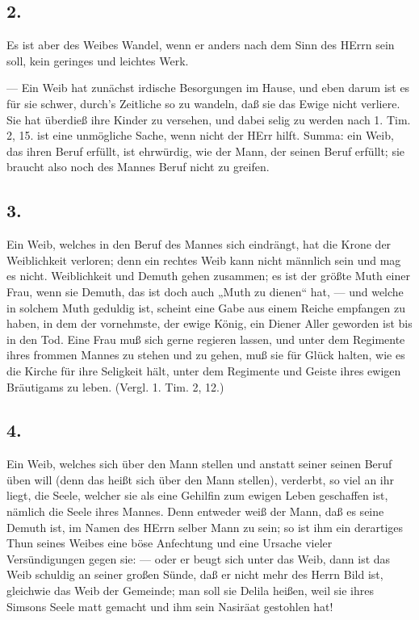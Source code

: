 \subsection{2.}

Es ist aber des Weibes Wandel, wenn er anders nach dem Sinn des HErrn sein soll, kein geringes und leichtes Werk.

— Ein Weib hat zunächst irdische Besorgungen im Hause, und eben darum ist es für sie schwer, durch’s Zeitliche so zu wandeln, daß sie das Ewige nicht verliere. Sie hat überdieß
ihre Kinder zu versehen, und dabei selig zu werden nach 1. Tim. 2, 15. ist eine unmögliche Sache, wenn nicht der HErr hilft. Summa: ein Weib, das ihren Beruf erfüllt, ist ehrwürdig, wie der Mann, der seinen Beruf erfüllt; sie braucht also noch des Mannes Beruf nicht zu greifen.

\subsection{3.}

Ein Weib, welches in den Beruf des Mannes sich eindrängt, hat die Krone der Weiblichkeit verloren; denn ein rechtes Weib kann nicht männlich sein und mag es nicht. Weiblichkeit und Demuth gehen zusammen; es ist der größte Muth einer Frau, wenn sie Demuth, das ist doch auch „Muth zu dienen“ hat, — und welche in solchem Muth geduldig ist, scheint eine Gabe aus einem Reiche empfangen zu haben, in dem der vornehmste, der ewige König, ein Diener Aller geworden ist bis in den Tod. Eine Frau muß sich gerne regieren lassen, und unter dem Regimente ihres frommen Mannes zu stehen und zu gehen, muß sie für Glück halten, wie es die Kirche für ihre Seligkeit hält, unter dem Regimente und Geiste ihres ewigen Bräutigams zu leben. (Vergl. 1. Tim. 2, 12.)

\subsection{4.}

Ein Weib, welches sich über den Mann stellen und anstatt seiner seinen Beruf üben will (denn das heißt sich über den Mann stellen), verderbt, so viel an ihr liegt, die Seele, welcher sie als eine Gehilfin zum ewigen Leben geschaffen ist, nämlich die Seele ihres Mannes. Denn entweder weiß der Mann, daß es seine Demuth ist, im Namen des HErrn selber Mann zu sein; so ist ihm ein derartiges Thun seines Weibes
eine böse Anfechtung und eine Ursache vieler Versündigungen gegen sie: — oder er beugt sich unter das Weib, dann ist das Weib schuldig an seiner großen Sünde, daß er nicht mehr des Herrn Bild ist, gleichwie das Weib der Gemeinde; man soll sie Delila heißen, weil sie ihres Simsons Seele matt gemacht und ihm sein Nasiräat gestohlen hat!

